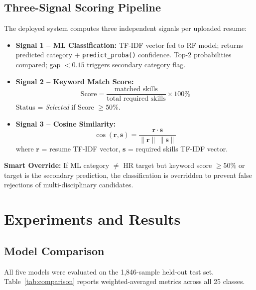 \documentclass[10pt,twocolumn]{article}
\begin{document}
\subsection{Three-Signal Scoring Pipeline}

The deployed system computes three independent signals per uploaded resume:

\begin{itemize}
  \item \textbf{Signal 1 -- ML Classification:} TF-IDF vector fed to RF model; returns predicted category + \texttt{predict\_proba()} confidence. Top-2 probabilities compared; gap $<0.15$ triggers secondary category flag.
  \item \textbf{Signal 2 -- Keyword Match Score:} \[\text{Score} = \frac{\text{matched skills}}{\text{total required skills}} \times 100\%\] Status = \textit{Selected} if Score $\geq 50\%$.
  \item \textbf{Signal 3 -- Cosine Similarity:} \[\cos(\mathbf{r}, \mathbf{s}) = \frac{\mathbf{r} \cdot \mathbf{s}}{\|\mathbf{r}\|\,\|\mathbf{s}\|}\] where $\mathbf{r}$ = resume TF-IDF vector, $\mathbf{s}$ = required skills TF-IDF vector.
\end{itemize}

\textbf{Smart Override:} If ML category $\neq$ HR target but keyword score $\geq 50\%$ or target is the secondary prediction, the classification is overridden to prevent false rejections of multi-disciplinary candidates.

\section{Experiments and Results}

\subsection{Model Comparison}

All five models were evaluated on the 1,846-sample held-out test set. Table~\ref{tab:comparison} reports weighted-averaged metrics across all 25 classes.
\end{document}
